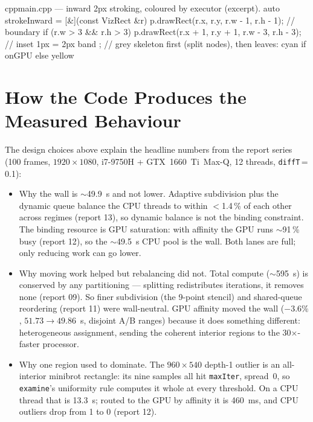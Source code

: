 \documentclass[
	english,
	letterpaper, oneside
]{article}
\begin{document}
\begin{sourcecode}{cpp}{main.cpp --- inward 2px stroking, coloured by executor (excerpt).}
auto strokeInward = [&](const VizRect &r) {
    p.drawRect(r.x, r.y, r.w - 1, r.h - 1);             // boundary
    if (r.w > 3 && r.h > 3)
        p.drawRect(r.x + 1, r.y + 1, r.w - 3, r.h - 3); // inset 1px = 2px band
};
// grey skeleton first (split nodes), then leaves: cyan if onGPU else yellow
\end{sourcecode}

\section{How the Code Produces the Measured Behaviour}

The design choices above explain the headline numbers from the report series (100
frames, $1920\times1080$, i7-9750H + GTX~1660~Ti~Max-Q, 12 threads,
\texttt{diffT}\,=\,0.1):

\begin{itemize}
    \item Why the wall is $\sim$49.9~s and not lower. Adaptive subdivision
    plus the dynamic queue balance the CPU threads to within $<$1.4\,\% of each
    other across regimes (report 13), so dynamic balance is not the binding
    constraint. The binding resource is GPU saturation: with affinity the GPU runs
    $\sim$91\,\% busy (report 12), so the $\sim$49.5~s CPU pool is the wall. Both
    lanes are full; only reducing work can go lower.

    \item Why moving work helped but rebalancing did not. Total compute
    ($\sim$595~s) is conserved by any partitioning --- splitting redistributes
    iterations, it removes none (report 09). So finer subdivision (the 9-point
    stencil) and shared-queue reordering (report 11) were wall-neutral. GPU affinity
    moved the wall ($-3.6\%$, $51.73\to49.86$~s, disjoint A/B ranges) because it does
    something different: heterogeneous assignment, sending the coherent
    interior regions to the 30$\times$-faster processor.

    \item Why one region used to dominate. The $960\times540$ depth-1
    outlier is an all-interior minibrot rectangle: its nine samples all hit
    \texttt{maxIter}, spread~0, so \texttt{examine}'s uniformity rule computes it
    whole at every threshold. On a CPU thread that is 13.3~s; routed to the GPU by
    affinity it is 460~ms, and CPU outliers drop from 1 to 0 (report 12).
\end{itemize}
\end{document}
